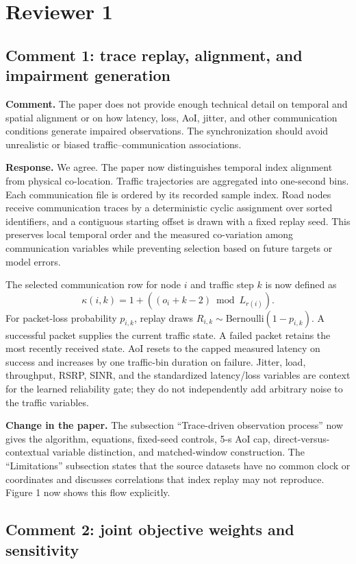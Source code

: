 \documentclass[11pt]{article}
\newcommand{\reviewcomment}[1]{\par\textcolor{commentblue}{\textbf{Comment.} #1}\par}
\newcommand{\authorresponse}[1]{\par\textcolor{responsegreen}{\textbf{Response.} #1}\par}
\newcommand{\paperchange}[1]{\par\textbf{Change in the paper.} #1\par}
\begin{document}
\section*{Reviewer 1}

\subsection*{Comment 1: trace replay, alignment, and impairment generation}

\reviewcomment{The paper does not provide enough technical detail on temporal and spatial alignment or on how latency, loss, AoI, jitter, and other communication conditions generate impaired observations. The synchronization should avoid unrealistic or biased traffic--communication associations.}

\authorresponse{We agree. The paper now distinguishes temporal index alignment from physical co-location. Traffic trajectories are aggregated into one-second bins. Each communication file is ordered by its recorded sample index. Road nodes receive communication traces by a deterministic cyclic assignment over sorted identifiers, and a contiguous starting offset is drawn with a fixed replay seed. This preserves local temporal order and the measured co-variation among communication variables while preventing selection based on future targets or model errors.}

The selected communication row for node $i$ and traffic step $k$ is now defined as
\[
\kappa(i,k)=1+((o_i+k-2)\bmod L_{r(i)}).
\]
For packet-loss probability $p_{i,k}$, replay draws $R_{i,k}\sim\mathrm{Bernoulli}(1-p_{i,k})$. A successful packet supplies the current traffic state. A failed packet retains the most recently received state. AoI resets to the capped measured latency on success and increases by one traffic-bin duration on failure. Jitter, load, throughput, RSRP, SINR, and the standardized latency/loss variables are context for the learned reliability gate; they do not independently add arbitrary noise to the traffic variables.

\paperchange{The subsection ``Trace-driven observation process'' now gives the algorithm, equations, fixed-seed controls, 5-s AoI cap, direct-versus-contextual variable distinction, and matched-window construction. The ``Limitations'' subsection states that the source datasets have no common clock or coordinates and discusses correlations that index replay may not reproduce. Figure 1 now shows this flow explicitly.}

\subsection*{Comment 2: joint objective weights and sensitivity}
\end{document}
